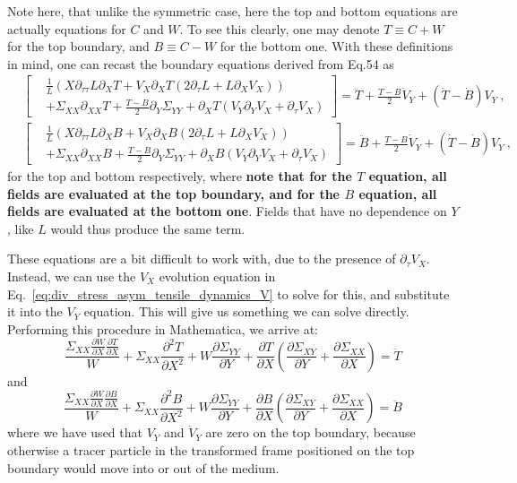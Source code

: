 \documentclass[12pt,a4paper]{article}
\newcommand{\p}{\partial}
\begin{document}
Note here, that unlike the symmetric case, here the top and bottom equations are actually equations for $C$ and $W$. To see this clearly, one may denote $T\equiv C+W$ for the top boundary, and $B\equiv C-W$ for the bottom one. With these definitions in mind, one can recast the boundary equations derived from Eq.54 as
\begin{equation}\label{eq:div_stress_asym_tensile_combined_V}
\begin{split}
&\left[\begin{split}
         &\frac{1}{L}\left(X \partial_{\tau\tau} L \partial_X T+ V_X \partial_X T \left(2\partial_{\tau}L + L \partial_X V_X \right) \right) \\
         &+ \Sigma_{XX} \partial_{XX} T + \frac{T-B}{2} \partial_Y\Sigma_{YY} +
         \partial_X T  \left(V_Y \partial_Y V_X + \partial_{\tau} V_X\right)
      \end{split}\right] = \ddot{T} + \frac{T-B}{2} \dot{V}_Y + \left(\dot{T}-\dot{B}\right) V_Y \ , \\
    &\left[\begin{split}
         &\frac{1}{L}\left(X \partial_{\tau\tau} L \partial_X B+ V_X \partial_X B \left(2\partial_{\tau}L + L \partial_X V_X \right) \right) \\
         &+ \Sigma_{XX} \partial_{XX} B + \frac{T-B}{2} \partial_Y\Sigma_{YY} +
         \partial_X B  \left(V_Y \partial_Y V_X + \partial_{\tau} V_X\right)
      \end{split}\right] = \ddot{B} + \frac{T-B}{2} \dot{V}_Y + \left(\dot{T}-\dot{B}\right) V_Y \ ,  
      \end{split}
\end{equation}
for the top and bottom respectively, where \textbf{note that for the $T$ equation, all fields are evaluated at the top boundary, and for the $B$ equation, all fields are evaluated at the bottom one}. Fields that have no dependence on $Y$, like $L$ would thus produce the same term. 

These equations are a bit difficult to work with, due to the presence of $\partial_\tau V_X$. Instead, we can use the $V_X$ evolution equation in Eq.~\ref{eq:div_stress_asym_tensile_dynamics_V} to solve for this, and substitute it into the $V_Y$ equation. This will give us something we can solve directly. Performing this procedure in Mathematica, we arrive at:
\begin{equation}
    \frac{\Sigma_{XX}\frac{\p W}{\p X}\frac{\p T}{\p X}}{W} + \Sigma_{XX}\frac{\p^2 T}{\p X^2} + W\frac{\p \Sigma_{YY}}{\p Y} + \frac{\p T}{\p X}\left(\frac{\p \Sigma_{XY}}{\p Y} + \frac{\p \Sigma_{XX}}{\p X}\right) = \ddot{T}
\end{equation}
and
\begin{equation}
    \frac{\Sigma_{XX}\frac{\p W}{\p X}\frac{\p B}{\p X}}{W} + \Sigma_{XX}\frac{\p^2 B}{\p X^2} + W\frac{\p \Sigma_{YY}}{\p Y} + \frac{\p B}{\p X}\left(\frac{\p \Sigma_{XY}}{\p Y} + \frac{\p \Sigma_{XX}}{\p X}\right) = \ddot{B}
\end{equation}
where we have used that $V_Y$ and $\dot{V}_Y$ are zero on the top boundary, because otherwise a tracer particle in the transformed frame positioned on the top boundary would move into or out of the medium. 
\end{document}
